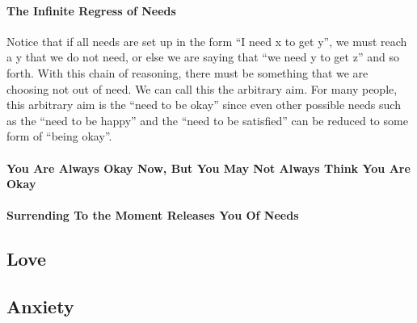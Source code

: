 \documentclass[a4paper, 12pt]{article}
\begin{document}
\paragraph{The Infinite Regress of Needs}
Notice that if all needs are set up in the form ``I need  x to get y'', we must reach a y that we do not need, or else we are saying that ``we need y to get z'' and so forth. With this chain of reasoning, there must be something that we are choosing not out of need. We can call this the arbitrary aim. For many people, this arbitrary aim is the ``need to be okay'' since even other possible needs such as the ``need to be happy'' and the ``need to be satisfied'' can be reduced to some form of ``being okay''.
\paragraph{You Are Always Okay Now, But You May Not Always Think You Are Okay}
\paragraph{Surrending To the Moment Releases You Of Needs}
\subsection{Love}
\subsection{Anxiety}
\end{document}
